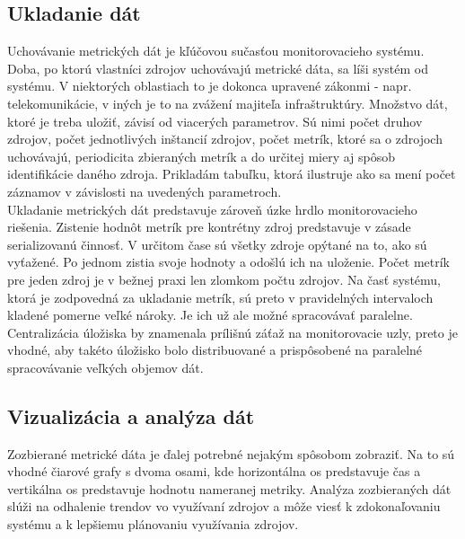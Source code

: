 \documentclass[12pt,twoside,color,cover,table]{fithesis3}
\begin{document}
\subsection{Ukladanie dát}
Uchovávanie metrických dát je kľúčovou sučasťou monitorovacieho systému. Doba, po ktorú vlastníci zdrojov uchovávajú metrické dáta, sa líši systém od systému. V niektorých oblastiach to je dokonca upravené zákonmi - napr. telekomunikácie,
v iných je to na zvážení majiteľa infraštruktúry. Množstvo dát, ktoré je treba uložiť, závisí od viacerých parametrov. Sú nimi počet druhov zdrojov, počet jednotlivých inštancií zdrojov, počet metrík, ktoré sa o zdrojoch
uchovávajú, periodicita zbieraných metrík a do určitej miery aj spôsob identifikácie daného zdroja. Prikladám tabuľku, ktorá ilustruje ako sa mení počet záznamov v závislosti na uvedených parametroch.
\\Ukladanie metrických dát predstavuje zároveň úzke hrdlo monitorovacieho riešenia. Zistenie hodnôt metrík pre kontrétny zdroj predstavuje v zásade serializovanú činnosť. V určitom čase sú všetky zdroje opýtané na to, ako sú vyťažené. Po jednom
zistia svoje hodnoty a odošlú ich na uloženie. Počet metrík pre jeden zdroj je v bežnej praxi len zlomkom počtu zdrojov. Na časť systému, ktorá je zodpovedná za ukladanie metrík, sú preto v pravidelných intervaloch kladené pomerne 
veľké nároky. Je ich už ale možné spracovávať paralelne. Centralizácia úložiska by znamenala prílišnú záťaž na monitorovacie uzly, preto je vhodné, aby takéto úložisko bolo distribuované a prispôsobené na paralelné spracovávanie veľkých
objemov dát.

\subsection{Vizualizácia a analýza dát}
Zozbierané metrické dáta je ďalej potrebné nejakým spôsobom zobraziť. Na to sú vhodné čiarové grafy s dvoma osami, kde horizontálna os predstavuje čas a vertikálna os predstavuje hodnotu nameranej metriky.
Analýza zozbieraných dát slúži na odhalenie trendov vo využívaní zdrojov a môže viesť k zdokonaľovaniu systému a k lepšiemu plánovaniu využívania zdrojov.
\end{document}
